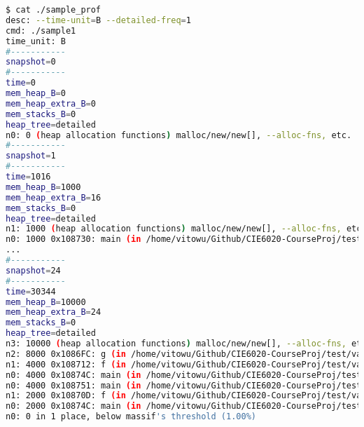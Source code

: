 \documentclass[]{article}
\begin{document}
	\begin{lstlisting}[language=bash, caption=(Sample Profile)]
$ cat ./sample_prof
desc: --time-unit=B --detailed-freq=1
cmd: ./sample1
time_unit: B
#-----------
snapshot=0
#-----------
time=0
mem_heap_B=0
mem_heap_extra_B=0
mem_stacks_B=0
heap_tree=detailed
n0: 0 (heap allocation functions) malloc/new/new[], --alloc-fns, etc.
#-----------
snapshot=1
#-----------
time=1016
mem_heap_B=1000
mem_heap_extra_B=16
mem_stacks_B=0
heap_tree=detailed
n1: 1000 (heap allocation functions) malloc/new/new[], --alloc-fns, etc.
n0: 1000 0x108730: main (in /home/vitowu/Github/CIE6020-CourseProj/test/valgrind_massif/sample1)
...
#-----------
snapshot=24
#-----------
time=30344
mem_heap_B=10000
mem_heap_extra_B=24
mem_stacks_B=0
heap_tree=detailed
n3: 10000 (heap allocation functions) malloc/new/new[], --alloc-fns, etc.
n2: 8000 0x1086FC: g (in /home/vitowu/Github/CIE6020-CourseProj/test/valgrind_massif/sample1)
n1: 4000 0x108712: f (in /home/vitowu/Github/CIE6020-CourseProj/test/valgrind_massif/sample1)
n0: 4000 0x10874C: main (in /home/vitowu/Github/CIE6020-CourseProj/test/valgrind_massif/sample1)
n0: 4000 0x108751: main (in /home/vitowu/Github/CIE6020-CourseProj/test/valgrind_massif/sample1)
n1: 2000 0x10870D: f (in /home/vitowu/Github/CIE6020-CourseProj/test/valgrind_massif/sample1)
n0: 2000 0x10874C: main (in /home/vitowu/Github/CIE6020-CourseProj/test/valgrind_massif/sample1)
n0: 0 in 1 place, below massif's threshold (1.00%)


\end{lstlisting}
\end{document}
